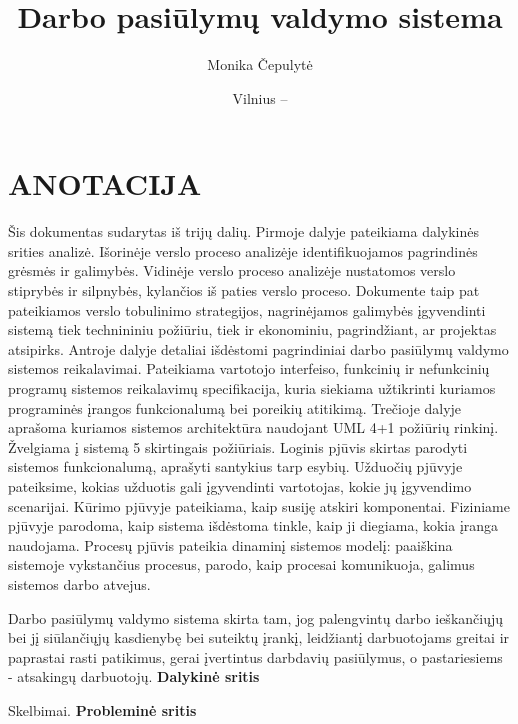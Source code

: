 \documentclass{VUMIFPSkursinis}
\title{Darbo pasiūlymų valdymo sistema}
\author{Monika Čepulytė}
\date{Vilnius – \the\year}
\begin{document}
\maketitle
\cleardoublepage{}
\setcounter{page}{2}

\section*{ANOTACIJA}
Šis dokumentas sudarytas iš trijų dalių. Pirmoje dalyje pateikiama dalykinės srities analizė. Išorinėje verslo proceso analizėje identifikuojamos pagrindinės grėsmės ir galimybės. Vidinėje verslo proceso analizėje nustatomos verslo stiprybės ir silpnybės, kylančios iš paties verslo proceso. Dokumente taip pat pateikiamos verslo tobulinimo strategijos, nagrinėjamos galimybės įgyvendinti sistemą tiek technininiu požiūriu, tiek ir ekonominiu, pagrindžiant, ar projektas atsipirks. Antroje dalyje detaliai išdėstomi pagrindiniai darbo pasiūlymų valdymo sistemos reikalavimai. Pateikiama vartotojo interfeiso, funkcinių ir nefunkcinių programų sistemos reikalavimų specifikacija, kuria siekiama užtikrinti kuriamos programinės įrangos funkcionalumą bei poreikių atitikimą. Trečioje dalyje aprašoma kuriamos sistemos architektūra naudojant UML 4+1 požiūrių rinkinį. Žvelgiama į sistemą 5 skirtingais požiūriais. Loginis pjūvis skirtas parodyti sistemos funkcionalumą, aprašyti santykius tarp esybių. Užduočių pjūvyje pateiksime, kokias užduotis gali įgyvendinti vartotojas, kokie jų įgyvendimo scenarijai.  Kūrimo pjūvyje pateikiama, kaip susiję atskiri komponentai. Fiziniame pjūvyje parodoma, kaip sistema išdėstoma tinkle, kaip ji diegiama, kokia įranga naudojama. Procesų pjūvis pateikia dinaminį sistemos modelį: paaiškina sistemoje vykstančius procesus, parodo, kaip procesai komunikuoja, galimus sistemos darbo atvejus.

\tableofcontents

Darbo pasiūlymų valdymo sistema skirta tam, jog palengvintų darbo ieškančiųjų bei jį siūlančiųjų kasdienybę bei suteiktų įrankį, leidžiantį darbuotojams greitai ir paprastai rasti patikimus, gerai įvertintus darbdavių pasiūlymus, o pastariesiems - atsakingų darbuotojų.
\newline
\newline
\textbf{Dalykinė sritis}

Skelbimai.
\newline
\newline
\textbf{Probleminė sritis}
\end{document}
